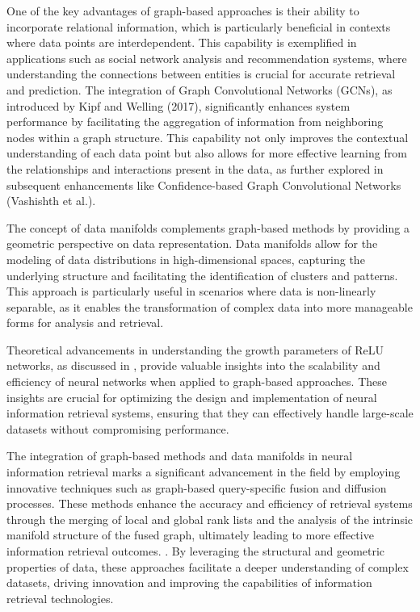 One of the key advantages of graph-based approaches is their ability to incorporate relational information, which is particularly beneficial in contexts where data points are interdependent. This capability is exemplified in applications such as social network analysis and recommendation systems, where understanding the connections between entities is crucial for accurate retrieval and prediction. The integration of Graph Convolutional Networks (GCNs), as introduced by Kipf and Welling (2017), significantly enhances system performance by facilitating the aggregation of information from neighboring nodes within a graph structure. This capability not only improves the contextual understanding of each data point but also allows for more effective learning from the relationships and interactions present in the data, as further explored in subsequent enhancements like Confidence-based Graph Convolutional Networks (Vashishth et al.). \cite{ullah2019graphconvolutionalnetworksanalysis}



The concept of data manifolds complements graph-based methods by providing a geometric perspective on data representation. Data manifolds allow for the modeling of data distributions in high-dimensional spaces, capturing the underlying structure and facilitating the identification of clusters and patterns. This approach is particularly useful in scenarios where data is non-linearly separable, as it enables the transformation of complex data into more manageable forms for analysis and retrieval.



Theoretical advancements in understanding the growth parameters of ReLU networks, as discussed in \cite{morina2024growthparametersapproximatingrelu}, provide valuable insights into the scalability and efficiency of neural networks when applied to graph-based approaches. These insights are crucial for optimizing the design and implementation of neural information retrieval systems, ensuring that they can effectively handle large-scale datasets without compromising performance.



The integration of graph-based methods and data manifolds in neural information retrieval marks a significant advancement in the field by employing innovative techniques such as graph-based query-specific fusion and diffusion processes. These methods enhance the accuracy and efficiency of retrieval systems through the merging of local and global rank lists and the analysis of the intrinsic manifold structure of the fused graph, ultimately leading to more effective information retrieval outcomes. \cite{alemu2018multifeaturefusionimageretrieval}. By leveraging the structural and geometric properties of data, these approaches facilitate a deeper understanding of complex datasets, driving innovation and improving the capabilities of information retrieval technologies.













